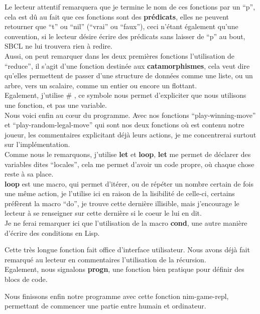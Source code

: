 \documentclass[a4paper, 12pt]{article}
\numberwithin{equation}{subsection}
\begin{document}
Le lecteur attentif remarquera que je termine le nom de ces fonctions par un ``p'', cela est dû au fait que ces fonctions sont des {\bf prédicats}, elles ne peuvent retourner que ``t'' ou ``nil'' (``vrai'' ou ``faux''), ceci n'étant également qu'une convention, si le lecteur désire écrire des prédicats sans laisser de ``p'' au bout, SBCL ne lui trouvera rien à redire.\\

Aussi, on peut remarquer dans les deux premières fonctions l'utilisation de ``reduce'', il s'agit d'une fonction destinée aux {\bf catamorphismes}, cela veut dire qu'elles permettent de passer d'une structure de données comme une liste, ou un arbre, vers un scalaire, comme un entier ou encore un flottant. \\

Egalement, j'utilise \# , ce symbole nous permet d'expliciter que nous utilisons une fonction, et pas une variable.\\

Nous voici enfin au cœur du programme. Avec nos fonctions ``play-winning-move'' et ``play-random-legal-move'' qui sont nos deux fonctions où est contenu notre joueur, les commentaires explicitant déjà leurs actions, je me concentrerai surtout sur l'implémentation. \\

Comme nous le remarquons, j'utilise {\bf let} et {\bf loop}, {\bf let} me permet de déclarer des variables dites ``locales'', cela me permet d'avoir un code propre, où chaque chose reste à sa place. \\

{\bf loop} est une macro, qui permet d'itérer, ou de répéter un nombre certain de fois une même action, je l'utilise ici en raison de la lisibilité de celle-ci, certains préfèrent la macro ``do'', je trouve cette dernière illisible, mais j'encourage le lecteur à se renseigner sur cette dernière si le coeur le lui en dit.\\

Je ne ferai remarquer ici que l'utilisation de la macro {\bf cond}, une autre manière d'écrire des conditions en Lisp.

Cette très longue fonction fait office d'interface utilisateur. Nous avons déjà fait remarqué au lecteur en commentaires l'utilisation de la récursion. \\

Egalement, nous signalons {\bf progn}, une fonction bien pratique pour définir des blocs de code.

Nous finissons enfin notre programme avec cette fonction nim-game-repl, permettant de commencer une partie entre humain et ordinateur.
\end{document}
